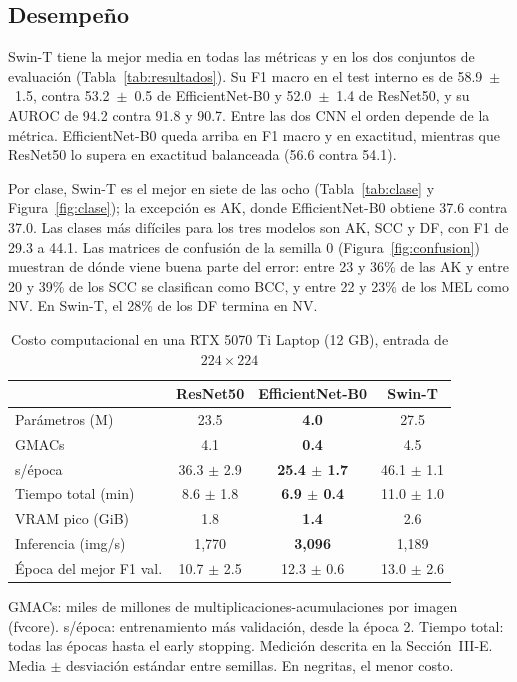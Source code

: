 \documentclass[conference]{IEEEtran}
\begin{document}
\subsection{Desempeño}

Swin-T tiene la mejor media en todas las métricas y en los dos conjuntos de evaluación (Tabla~\ref{tab:resultados}). Su F1 macro en el test interno es de 58.9~$\pm$~1.5, contra 53.2~$\pm$~0.5 de EfficientNet-B0 y 52.0~$\pm$~1.4 de ResNet50, y su AUROC de 94.2 contra 91.8 y 90.7. Entre las dos CNN el orden depende de la métrica. EfficientNet-B0 queda arriba en F1 macro y en exactitud, mientras que ResNet50 lo supera en exactitud balanceada (56.6 contra 54.1).

Por clase, Swin-T es el mejor en siete de las ocho (Tabla~\ref{tab:clase} y Figura~\ref{fig:clase}); la excepción es AK, donde EfficientNet-B0 obtiene 37.6 contra 37.0. Las clases más difíciles para los tres modelos son AK, SCC y DF, con F1 de 29.3 a 44.1. Las matrices de confusión de la semilla 0 (Figura~\ref{fig:confusion}) muestran de dónde viene buena parte del error: entre 23 y 36\% de las AK y entre 20 y 39\% de los SCC se clasifican como BCC, y entre 22 y 23\% de los MEL como NV. En Swin-T, el 28\% de los DF termina en NV.

\begin{table}[!t]
\centering
\caption{Costo computacional en una RTX 5070 Ti Laptop (12 GB), entrada de $224\times224$}
\label{tab:costo}
\footnotesize
\setlength{\tabcolsep}{4pt}
\begin{tabular}{lccc}
\toprule
 & ResNet50 & EfficientNet-B0 & Swin-T \\
\midrule
Parámetros (M) & 23.5 & \textbf{4.0} & 27.5 \\
GMACs & 4.1 & \textbf{0.4} & 4.5 \\
s/época & 36.3 $\pm$ 2.9 & \textbf{25.4 $\pm$ 1.7} & 46.1 $\pm$ 1.1 \\
Tiempo total (min) & 8.6 $\pm$ 1.8 & \textbf{6.9 $\pm$ 0.4} & 11.0 $\pm$ 1.0 \\
VRAM pico (GiB) & 1.8 & \textbf{1.4} & 2.6 \\
Inferencia (img/s) & 1,770 & \textbf{3,096} & 1,189 \\
Época del mejor F1 val. & 10.7 $\pm$ 2.5 & 12.3 $\pm$ 0.6 & 13.0 $\pm$ 2.6 \\
\bottomrule
\end{tabular}
\par\vspace{2pt}
\parbox{\columnwidth}{\scriptsize GMACs: miles de millones de multiplicaciones-acumulaciones por imagen (fvcore). s/época: entrenamiento más validación, desde la época 2. Tiempo total: todas las épocas hasta el early stopping. Medición descrita en la Sección~III-E. Media $\pm$ desviación estándar entre semillas. En negritas, el menor costo.}
\end{table}
\end{document}
